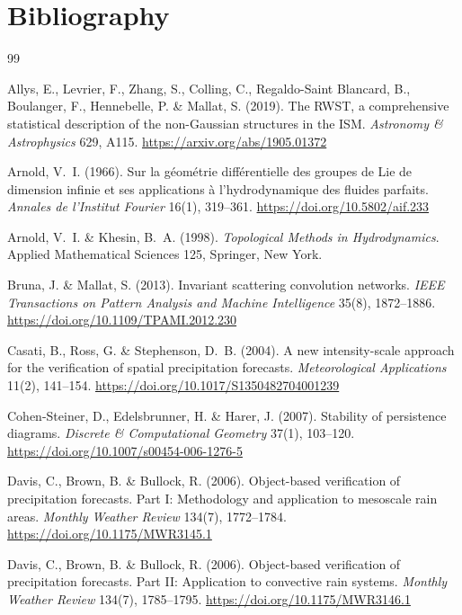 \documentclass[11pt]{article}
\begin{document}
\section{Bibliography}
\label{sec:bib}

\begin{thebibliography}{99}
\small

 Allys, E., Levrier, F., Zhang, S., Colling, C., Regaldo-Saint Blancard,
B., Boulanger, F., Hennebelle, P. \& Mallat, S. (2019). The RWST, a comprehensive statistical
description of the non-Gaussian structures in the ISM. \emph{Astronomy \& Astrophysics} 629,
A115. \url{https://arxiv.org/abs/1905.01372}

 Arnold, V.\ I. (1966). Sur la g\'eom\'etrie diff\'erentielle des groupes
de Lie de dimension infinie et ses applications \`a l'hydrodynamique des fluides parfaits.
\emph{Annales de l'Institut Fourier} 16(1), 319--361.
\url{https://doi.org/10.5802/aif.233}

 Arnold, V.\ I. \& Khesin, B.\ A. (1998). \emph{Topological Methods
in Hydrodynamics}. Applied Mathematical Sciences 125, Springer, New York.

 Bruna, J. \& Mallat, S. (2013). Invariant scattering convolution
networks. \emph{IEEE Transactions on Pattern Analysis and Machine Intelligence} 35(8),
1872--1886. \url{https://doi.org/10.1109/TPAMI.2012.230}

 Casati, B., Ross, G. \& Stephenson, D.\ B. (2004). A new intensity-scale
approach for the verification of spatial precipitation forecasts.
\emph{Meteorological Applications} 11(2), 141--154.
\url{https://doi.org/10.1017/S1350482704001239}

 Cohen-Steiner, D., Edelsbrunner, H. \& Harer, J. (2007). Stability
of persistence diagrams. \emph{Discrete \& Computational Geometry} 37(1), 103--120.
\url{https://doi.org/10.1007/s00454-006-1276-5}

 Davis, C., Brown, B. \& Bullock, R. (2006). Object-based verification of
precipitation forecasts. Part I: Methodology and application to mesoscale rain areas.
\emph{Monthly Weather Review} 134(7), 1772--1784.
\url{https://doi.org/10.1175/MWR3145.1}

 Davis, C., Brown, B. \& Bullock, R. (2006). Object-based verification of
precipitation forecasts. Part II: Application to convective rain systems.
\emph{Monthly Weather Review} 134(7), 1785--1795.
\url{https://doi.org/10.1175/MWR3146.1}


\end{thebibliography}
\end{document}
